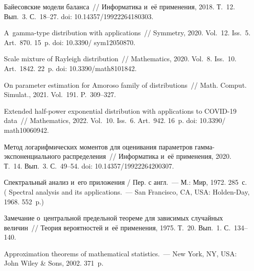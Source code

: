 \begin{multicols}{2}
{{\begin{thebibliography}{99}
Байесовские модели баланса~// Информатика и~её применения, 2018. Т.~12. Вып.~3. С.~18--27.
doi: 10.14357/19922264180303.

A~gamma-type distribution with applications~// Symmetry, 2020. Vol.~12. Iss.~5. Art.~870. 15~p. doi: 10.3390/ sym12050870.

Scale mixture of Rayleigh distribution~// Mathematics, 2020. Vol.~8. Iss.~10. Art.~1842. 22~p. doi: 10.3390/math8101842.

On parameter estimation for Amoroso family of distributions~// Math. Comput. Simulat., 2021. Vol.~191. P.~309--327.

Extended half-power exponential distribution with applications to COVID-19 data~// Mathematics, 2022. Vol.~10. Iss.~6. Art.~942. 
16~p. doi: 10.3390/ math10060942.

Метод логарифмических моментов для оценивания па\-ра\-мет\-ров гам\-ма-экс\-по\-нен\-ци\-аль\-но\-го рас\-пре\-де\-ле\-ния~// 
Информатика и~её применения, 2020. Т.~14. Вып.~3. С.~49--54. doi: 10.14357/19922264200307.

 Спект\-раль\-ный анализ и~его приложения / Пер. с англ.~--- М.: Мир, 1972. 285~с. (
 Spectral analysis and its applications.~--- San Francisco, CA, USA: Holden-Day, 1968. 552~p.)



Замечание о~цент\-раль\-ной предельной тео\-ре\-ме для зависимых случайных величин~// Тео\-рия вероятностей и~её применения, 1975. Т.~20. Вып.~1. С.~134--140.

Approximation theorems of mathematical statistics.~--- New York, NY, USA: John Wiley \& Sons, 2002. 371~p.
\end{thebibliography}

 }
 }

\end{multicols}

